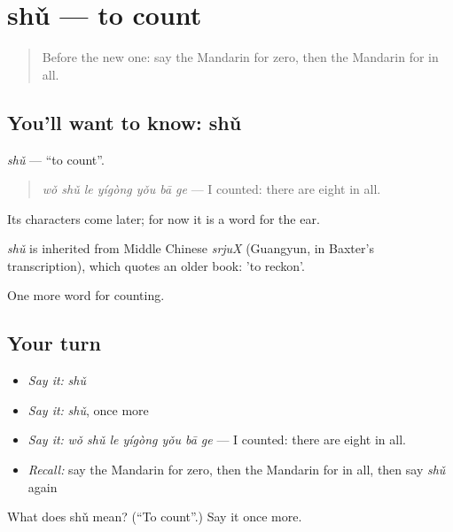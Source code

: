\section[shǔ]{shǔ — to count}

\label{lesson:ZH-C132-shu}



\begin{quote}
Before the new one: say the Mandarin for zero, then the Mandarin for in all.
\end{quote}

\subsection*{You'll want to know: shǔ}
\emph{shǔ} — \textquotedblleft{}to count\textquotedblright{}.

\begin{quote}
\emph{wǒ shǔ le yígòng yǒu bā ge} — I counted: there are eight in all.
\end{quote}

Its characters come later; for now it is a word for the ear.

\begin{cousinweb}
\emph{shǔ} is inherited from Middle Chinese \emph{srjuX} (Guangyun, in Baxter's transcription), which quotes an older book: 'to reckon'.
\end{cousinweb}

\begin{grammarlens}[title={What you've built}]
One more word for counting.
\end{grammarlens}

\subsection*{Your turn}
\begin{itemize}
\raggedright
  \item \emph{Say it:} \emph{shǔ}
  \item \emph{Say it:} \emph{shǔ}, once more
  \item \emph{Say it:} \emph{wǒ shǔ le yígòng yǒu bā ge} — I counted: there are eight in all.
  \item \emph{Recall:} say the Mandarin for zero, then the Mandarin for in all, then say \emph{shǔ} again
\end{itemize}

\begin{tcolorbox}[breakable,colback=teal!4,colframe=teal!35!black,title={Before you move on}]
What does shǔ mean? (\textquotedblleft{}To count\textquotedblright{}.) Say it once more.
\end{tcolorbox}
